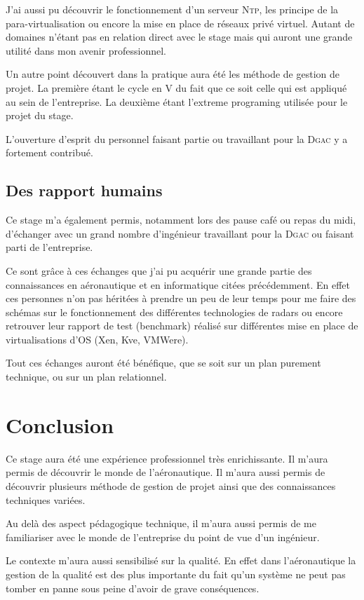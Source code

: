 J'ai aussi pu découvrir le fonctionnement d'un serveur \textsc{Ntp}, les principe de la para-virtualisation ou encore la mise en place de réseaux privé virtuel. Autant de domaines n'étant pas en relation direct avec le stage mais qui auront une grande utilité dans mon avenir professionnel. 

Un autre point découvert dans la pratique aura été les méthode de gestion de projet. La première étant le cycle en V du fait que ce soit celle qui est appliqué au sein de l'entreprise. La deuxième étant l'extreme programing utilisée pour le projet du stage.

L'ouverture d'esprit du personnel faisant partie ou travaillant pour la \textsc{Dgac} y a fortement contribué. 

    \subsection{Des rapport humains}
Ce stage m'a également permis, notamment lors des pause café ou repas du midi, d'échanger avec un grand nombre d'ingénieur travaillant pour la \textsc{Dgac} ou faisant parti de l'entreprise. 

Ce sont grâce à ces échanges que j'ai pu acquérir une grande partie des connaissances en aéronautique et en informatique citées précédemment. En effet ces personnes n'on pas héritées à prendre un peu de leur temps pour me faire des schémas sur le fonctionnement des différentes technologies de radars ou encore retrouver leur rapport de test (benchmark) réalisé sur différentes mise en place de virtualisations d'OS (Xen, Kve, VMWere).

Tout ces échanges auront été bénéfique, que se soit sur un plan purement technique, ou sur un plan relationnel.  

\section{Conclusion}
Ce stage aura été une expérience professionnel très enrichissante. Il m'aura permis de découvrir le monde de l'aéronautique. Il m'aura aussi permis de découvrir plusieurs méthode de gestion de projet ainsi que des connaissances techniques variées.

Au delà des aspect pédagogique technique, il m'aura aussi permis de me familiariser avec le monde de l'entreprise du point de vue d'un ingénieur. 

Le contexte m'aura aussi sensibilisé sur la qualité. En effet dans l'aéronautique la gestion de la qualité est des plus importante du fait qu'un système ne peut pas tomber en panne sous peine d'avoir de grave conséquences. 
 









